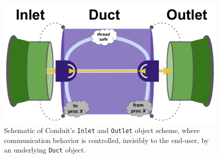    \begin{figure}[thpb]
      \centering
      \includegraphics[width=0.8\linewidth]{img/conduit}
      \caption{Schematic of Conduit's \texttt{Inlet} and \texttt{Outlet} object scheme, where communication behavior is controlled, invisibly to the end-user, by an underlying \texttt{Duct} object.}
      \label{fig:conduit}
   \end{figure}